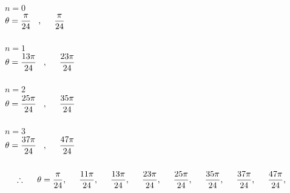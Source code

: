 \documentclass[11pt,a4paper]{article}
\begin{document}
$n = 0$\\

$\theta = \dfrac{\pi}{24}\hspace{0.3cm}, \hspace{0.5cm} \dfrac{\pi}{24}$\\\\





$n = 1$\\

$\theta = \dfrac{13\pi}{24}\hspace{0.3cm}, \hspace{0.5cm} \dfrac{23\pi}{24}$\\\\





$n = 2$\\

$\theta = \dfrac{25\pi}{24}\hspace{0.3cm}, \hspace{0.5cm} \dfrac{35\pi}{24}$\\\\




$n = 3$\\

$\theta = \dfrac{37\pi}{24}\hspace{0.3cm}, \hspace{0.5cm} \dfrac{47\pi}{24}$\\\\





$$\therefore \hspace{0.5cm} \theta  = \dfrac{\pi}{24}, \hspace{0.5cm} \dfrac{11\pi}{24}, \hspace{0.5cm} \dfrac{13\pi}{24}, \hspace{0.5cm}  \dfrac{23\pi}{24}, \hspace{0.5cm}  \dfrac{25\pi}{24}, \hspace{0.5cm}  \dfrac{35\pi}{24}, \hspace{0.5cm}  \dfrac{37\pi}{24}, \hspace{0.5cm}  \dfrac{47\pi}{24}, \hspace{0.5cm}$$\\\\
\end{document}
